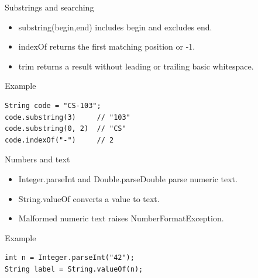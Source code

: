 \documentclass[10pt,aspectratio=169]{beamer}
\begin{document}
\begin{frame}[fragile,t]{Substrings and searching}
\begin{itemize}
\item substring(begin,end) includes begin and excludes end.
\item indexOf returns the first matching position or -1.
\item trim returns a result without leading or trailing basic whitespace.
\end{itemize}
\vspace{1mm}\begin{block}{Example}
\begin{lstlisting}
String code = "CS-103";
code.substring(3)     // "103"
code.substring(0, 2)  // "CS"
code.indexOf("-")     // 2
\end{lstlisting}
\end{block}
\end{frame}

\begin{frame}[fragile,t]{Numbers and text}
\begin{itemize}
\item Integer.parseInt and Double.parseDouble parse numeric text.
\item String.valueOf converts a value to text.
\item Malformed numeric text raises NumberFormatException.
\end{itemize}
\vspace{1mm}\begin{block}{Example}
\begin{lstlisting}
int n = Integer.parseInt("42");
String label = String.valueOf(n);
\end{lstlisting}
\end{block}
\end{frame}
\end{document}

